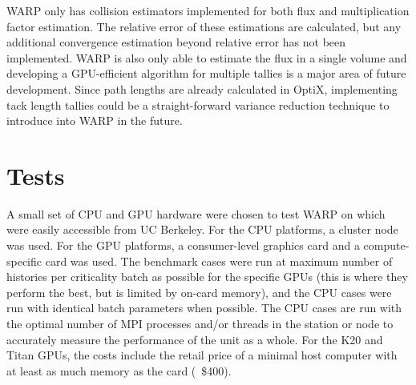 \documentclass[preprint,12pt]{elsarticle}
\begin{document}
WARP only has collision estimators implemented for both flux and multiplication factor estimation.  The relative error of these estimations are calculated, but any additional convergence estimation beyond relative error has not been implemented.  WARP is also only able to estimate the flux in a single volume and developing a GPU-efficient algorithm for multiple tallies is a major area of future development.  Since path lengths are already calculated in OptiX, implementing tack length tallies could be a straight-forward variance reduction technique to introduce into WARP in the future.

\section{Tests}
\label{sec:tests}

A small set of CPU and GPU hardware were chosen to test WARP on which were easily accessible from UC Berkeley.  For the CPU platforms, a cluster node was used.  For the GPU platforms, a consumer-level graphics card and a compute-specific card was used. The benchmark cases were run at maximum number of histories per criticality batch as possible for the specific GPUs (this is where they perform the best, but is limited by on-card memory), and the CPU cases were run with identical batch parameters  when possible.   The CPU cases are run with the optimal number of MPI processes and/or threads in the station or node to accurately measure the performance of the unit as a whole.    For the K20 and Titan GPUs, the costs include the retail price of a minimal host computer with at least as much memory as the card (~\$400).  
\end{document}
